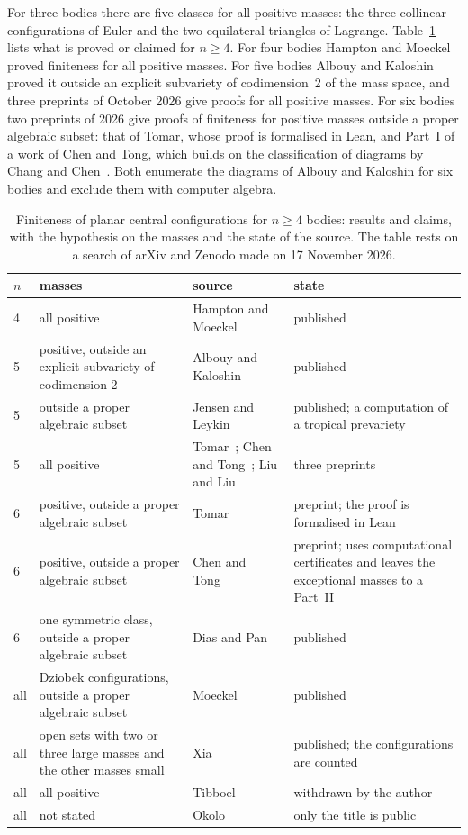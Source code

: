 \documentclass[11pt]{amsart}
\theoremstyle{definition}
\theoremstyle{remark}
\numberwithin{equation}{section}
\begin{document}
For three bodies there are five classes for all positive masses: the three collinear configurations of
Euler and the two equilateral triangles of Lagrange. Table~\ref{tab:known} lists what is proved or
claimed for $n \ge 4$. For four bodies Hampton and Moeckel proved finiteness for all positive masses.
For five bodies Albouy and Kaloshin proved it outside an explicit subvariety of codimension~2 of the mass
space, and three preprints of October 2026 give proofs for all positive masses. For six bodies two preprints
of 2026 give proofs of finiteness for positive masses outside a proper algebraic subset: that of Tomar, whose
proof is formalised in Lean, and Part~I of a work of Chen and Tong, which builds on the classification of
diagrams by Chang and Chen~\cite{changchen2024jsc,changchen2025siads}. Both enumerate the diagrams of
Albouy and Kaloshin for six bodies and exclude them with computer algebra.

\begin{table}[ht]
\caption{Finiteness of planar central configurations for $n \ge 4$ bodies: results and claims, with the
hypothesis on the masses and the state of the source. The table rests on a search of arXiv and Zenodo
made on 17 November 2026.}\label{tab:known}
\small
\begin{tabular}{@{}l>{\raggedright}p{}>{\raggedright}p{}>{\raggedright\arraybackslash}p{}@{}}
\toprule
$n$ & masses & source & state \\
\midrule
4 & all positive & Hampton and Moeckel~\cite{hamptonmoeckel2006} & published \\
5 & positive, outside an explicit subvariety of codimension 2 & Albouy and Kaloshin~\cite{albouykaloshin2012} & published \\
5 & outside a proper algebraic subset & Jensen and Leykin~\cite{jensenleykin2025} & published; a computation of a tropical prevariety \\
5 & all positive & Tomar~\cite{tomar5}; Chen and Tong~\cite{chentong5}; Liu and Liu~\cite{liuliu5} & three preprints \\
6 & positive, outside a proper algebraic subset & Tomar~\cite{tomar6} & preprint; the proof is formalised in Lean \\
6 & positive, outside a proper algebraic subset & Chen and Tong~\cite{chentong6} & preprint; uses computational certificates and leaves the exceptional masses to a Part~II \\
6 & one symmetric class, outside a proper algebraic subset & Dias and Pan~\cite{diaspan2020} & published \\
all & Dziobek configurations, outside a proper algebraic subset & Moeckel~\cite{moeckel2001} & published \\
all & open sets with two or three large masses and the other masses small & Xia~\cite{xia1991} & published; the configurations are counted \\
all & all positive & Tibboel~\cite{tibboel2013} & withdrawn by the author \\
all & not stated & Okolo~\cite{okolo2026} & only the title is public \\
\bottomrule
\end{tabular}
\end{table}
\end{document}
